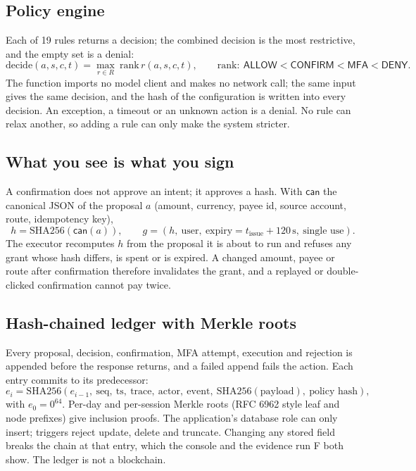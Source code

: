 \documentclass[11pt,a4paper]{article}
\renewcommand{\mathrm}[1]{\text{#1}}}
\begin{document}
\subsection{Policy engine}
Each of 19 rules returns a decision; the combined decision is the most restrictive, and the empty set is a denial:
\begin{equation*}
\mathrm{decide}(a,s,c,t)=\max_{r\in R}\ \mathrm{rank}\,r(a,s,c,t),\qquad \mathrm{rank}:\ \textsf{ALLOW}<\textsf{CONFIRM}<\textsf{MFA}<\textsf{DENY}.
\end{equation*}
The function imports no model client and makes no network call; the same input gives the same decision, and the hash of the configuration is written into every decision. An exception, a timeout or an unknown action is a denial. No rule can relax another, so adding a rule can only make the system stricter.

\subsection{What you see is what you sign}
A confirmation does not approve an intent; it approves a hash. With $\mathsf{can}$ the canonical JSON of the proposal $a$ (amount, currency, payee id, source account, route, idempotency key),
\begin{equation*}
h=\mathrm{SHA256}(\mathsf{can}(a)),\qquad g=(h,\ \text{user},\ \text{expiry}=t_{\mathrm{issue}}+120\,\mathrm{s},\ \text{single use}).
\end{equation*}
The executor recomputes $h$ from the proposal it is about to run and refuses any grant whose hash differs, is spent or is expired. A changed amount, payee or route after confirmation therefore invalidates the grant, and a replayed or double-clicked confirmation cannot pay twice.

\subsection{Hash-chained ledger with Merkle roots}
Every proposal, decision, confirmation, MFA attempt, execution and rejection is appended before the response returns, and a failed append fails the action. Each entry commits to its predecessor:
\begin{equation*}
e_i=\mathrm{SHA256}(e_{i-1},\ \mathrm{seq},\ \mathrm{ts},\ \mathrm{trace},\ \mathrm{actor},\ \mathrm{event},\ \mathrm{SHA256}(\mathrm{payload}),\ \mathrm{policy\ hash}),
\end{equation*}
with $e_0=0^{64}$. Per-day and per-session Merkle roots (RFC 6962 style leaf and node prefixes) give inclusion proofs. The application's database role can only insert; triggers reject update, delete and truncate. Changing any stored field breaks the chain at that entry, which the console and the evidence run F both show. The ledger is not a blockchain.
\end{document}
